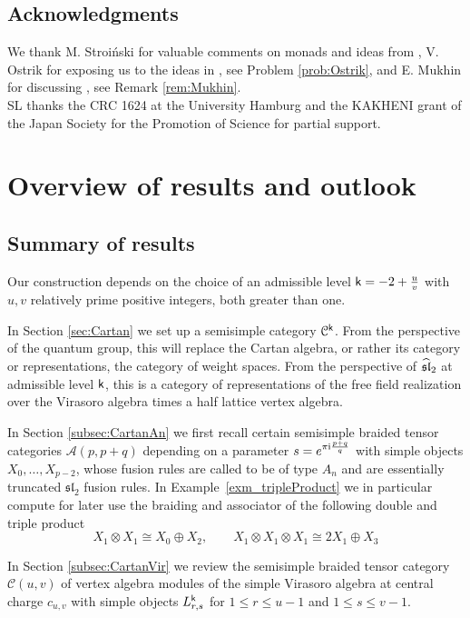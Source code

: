 \documentclass[a4paper, reqno]{amsart}
\theoremstyle{introTheorems}
\newcommand\cA{\mathcal{A}}
\newcommand\cC{\mathcal{C}}
\renewcommand\sl{\mathfrak{sl}}
\renewcommand{\1}{\mathbbold{1}}
\begin{document}
\subsection{Acknowledgments}

We thank M. Stroiński for valuable comments on monads and ideas from \cite{SZ24}, V. Ostrik for exposing us to the ideas in \cite{Ost97,CEO25}, see Problem \ref{prob:Ostrik}, and E. Mukhin for discussing \cite{FJM25,FJM26}, see Remark \ref{rem:Mukhin}. \\  SL thanks the CRC 1624 at the University Hamburg and the KAKHENI grant of the Japan Society for the Promotion of Science for partial support.  


    
\section{Overview of results and outlook}
    



\subsection{Summary of results}

Our construction depends on the choice of an admissible level $\mathsf{k}=-2+\frac{u}{v}$ with $u,v$ relatively prime positive integers, both greater than one.

\bigskip

In Section \ref{sec:Cartan} we set up a semisimple category $\cC^\k$. From the perspective of the quantum group, this will replace the Cartan algebra, or rather its category or representations, the category of weight spaces. From the perspective of $\slhat_2$ at admissible level $\mathsf{k}$, this is a category of representations of the free field realization over the Virasoro algebra times a half lattice vertex algebra.

In Section \ref{subsec:CartanAn} we first recall certain semisimple braided tensor categories $\cA(p,p+q)$ depending on a parameter $s=e^{\pi\mathrm{i}\frac{p+q}{q}}$ with simple objects $X_0,\ldots,X_{p-2}$, whose fusion rules are called to be of type $A_n$ and are essentially truncated $\sl_2$ fusion rules. In Example~\ref{exm_tripleProduct} we in particular compute for later use the braiding and associator of the following double and triple product 
$$X_1\otimes X_1\cong X_0\oplus X_2,\qquad X_1\otimes X_1\otimes X_1\cong2X_1\oplus X_3$$

In Section \ref{subsec:CartanVir} we review the semisimple braided tensor category $\cC(u,v)$ of vertex algebra modules of 
the simple Virasoro algebra at central charge $c_{u,v}$ with simple objects $L^{\mathsf{k}}_{r,s}$ for $1 \leq  r \leq  u-1$ and $1 \leq s \leq v-1$. 
\end{document}
